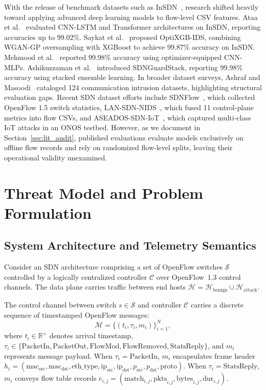 \documentclass[journal]{IEEEtran}
\begin{document}
With the release of benchmark datasets such as InSDN~\cite{elsayed2020insdn}, research shifted heavily toward applying advanced deep learning models to flow-level CSV features. Ataa et al.~\cite{ataa2024intrusion} evaluated CNN-LSTM and Transformer architectures on InSDN, reporting accuracies up to 99.02\%. Saykat et al.~\cite{optixgb2026} proposed OptiXGB-IDS, combining WGAN-GP oversampling with XGBoost to achieve 99.87\% accuracy on InSDN. Mehmood et al.~\cite{sajid2025ddos} reported 99.98\% accuracy using optimizer-equipped CNN-MLPs. Ashikuzzaman et al.~\cite{ashikuzzaman2026sdnguardstack} introduced SDNGuardStack, reporting 99.98\% accuracy using stacked ensemble learning. In broader dataset surveys, Ashraf and Masoodi~\cite{ashraf2026survey} cataloged 124 communication intrusion datasets, highlighting structural evaluation gaps. Recent SDN dataset efforts include SDNFlow~\cite{sdnflow2024}, which collected OpenFlow 1.5 switch statistics, LAN-SDN-NIDS~\cite{lansdnnids2026}, which fused 11 control-plane metrics into flow CSVs, and ASEADOS-SDN-IoT~\cite{aseados_sdn_iot2026}, which captured multi-class IoT attacks in an ONOS testbed. However, as we document in Section~\ref{sec:lit_audit}, published evaluations evaluate models exclusively on offline flow records and rely on randomized flow-level splits, leaving their operational validity unexamined.

\section{Threat Model and Problem Formulation}\label{sec:threat}
\subsection{System Architecture and Telemetry Semantics}
Consider an SDN architecture comprising a set of OpenFlow switches $\mathcal{S}$ controlled by a logically centralized controller $\mathcal{C}$ over OpenFlow~1.3 control channels. The data plane carries traffic between end hosts $\mathcal{H} = \mathcal{H}_{\text{benign}} \cup \mathcal{H}_{\text{attack}}$.

The control channel between switch $s \in \mathcal{S}$ and controller $\mathcal{C}$ carries a discrete sequence of timestamped OpenFlow messages:
\begin{equation}
\mathcal{M} = \{(t_i, \tau_i, m_i)\}_{i=1}^N,
\end{equation}
where $t_i \in \mathbb{R}^+$ denotes arrival timestamp, $\tau_i \in \{\text{PacketIn}, \allowbreak \text{PacketOut}, \allowbreak \text{FlowMod}, \allowbreak \text{FlowRemoved}, \allowbreak \text{StatsReply}\}$, and $m_i$ represents message payload. When $\tau_i = \text{PacketIn}$, $m_i$ encapsulates frame header $h_i = (\text{mac}_{\text{src}}, \allowbreak \text{mac}_{\text{dst}}, \allowbreak \text{eth\_type}, \allowbreak \text{ip}_{\text{src}}, \allowbreak \text{ip}_{\text{dst}}, \allowbreak p_{\text{src}}, \allowbreak p_{\text{dst}}, \allowbreak \text{proto})$. When $\tau_i = \text{StatsReply}$, $m_i$ conveys flow table records $e_{i,j} = (\text{match}_{i,j}, \allowbreak \text{pkts}_{i,j}, \allowbreak \text{bytes}_{i,j}, \allowbreak \text{dur}_{i,j})$.
\end{document}
